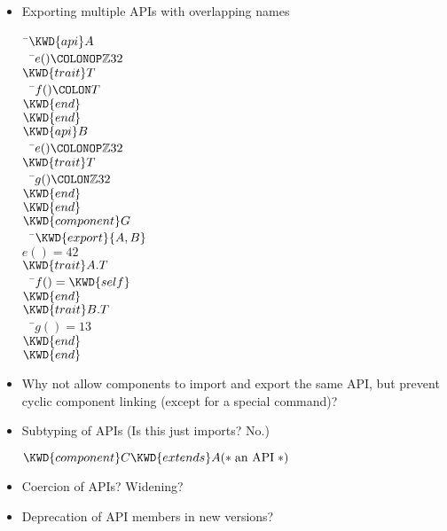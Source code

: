 \begin{itemize}
  \item Exporting multiple APIs with overlapping names
\begin{Fortress}
{\tt~}\pushtabs\=\+\( \KWD{api} A\)\\
{\tt~~}\pushtabs\=\+\(   e()\COLONOP\mathbb{Z}32\)\\
\(   \KWD{trait} T\)\\
{\tt~~}\pushtabs\=\+\(     f()\COLON T\)\-\\\poptabs
\(   \KWD{end}\)\-\\\poptabs
\( \KWD{end}\)\\
\( \KWD{api} B\)\\
{\tt~~}\pushtabs\=\+\(   e()\COLONOP\mathbb{Z}32\)\\
\(   \KWD{trait} T\)\\
{\tt~~}\pushtabs\=\+\(     g()\COLON \mathbb{Z}32\)\-\\\poptabs
\(   \KWD{end}\)\-\\\poptabs
\( \KWD{end}\)\\
\( \KWD{component} G\)\\
{\tt~~}\pushtabs\=\+\(   \KWD{export} \{A, B\}\)\\
\(   e() = 42\)\\
\(   \KWD{trait} A.T\)\\
{\tt~~}\pushtabs\=\+\(     f() = \mathord{\KWD{self}}\)\-\\\poptabs
\(   \KWD{end}\)\\
\(   \KWD{trait} B.T\)\\
{\tt~~}\pushtabs\=\+\(     g() = 13\)\-\\\poptabs
\(   \KWD{end}\)\-\\\poptabs
\( \KWD{end}\)\-\\\poptabs
\end{Fortress}


  \item Why not allow components to import and export the same API, but
  prevent cyclic component linking (except for a special
   command)?

  \item Subtyping of APIs  (Is this just imports?  No.)
\begin{Fortress}
\(\KWD{component} C \KWD{extends} A \mathtt{(*}\;\hbox{\rm  an API \unskip}\;\mathtt{*)}\)
\end{Fortress}
  \item Coercion of APIs?  Widening?
  \item Deprecation of API members in new versions?
\end{itemize}

